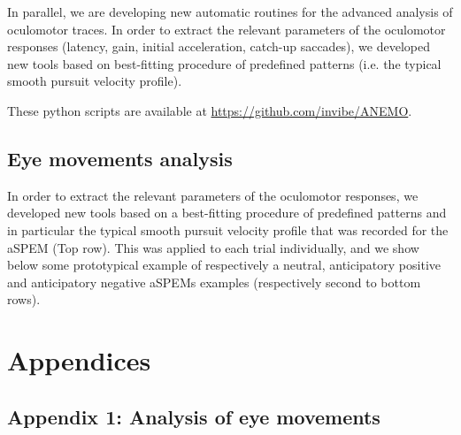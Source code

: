 \documentclass[profile,final,english,draft]{article}%
\begin{document}

In parallel, we are developing new automatic routines for the advanced analysis of oculomotor traces. In order to extract the relevant parameters of the oculomotor responses (latency, gain, initial acceleration, catch-up saccades), we developed new tools based on best-fitting procedure of predefined patterns (i.e. the typical smooth pursuit velocity profile).

These python scripts are available at \url{https://github.com/invibe/ANEMO}.


\subsection{Eye movements analysis}

In order to extract the relevant parameters of the oculomotor responses, we developed new tools based on a best-fitting procedure of predefined patterns and in particular the typical smooth pursuit velocity profile that was recorded for the aSPEM (Top row). This was applied to each trial individually, and we show below some prototypical example of respectively a neutral, anticipatory positive and anticipatory negative aSPEMs examples (respectively second to bottom rows).
\section{Appendices}
\subsection{Appendix 1: Analysis of eye movements}
\label{app:em}
\end{document}
